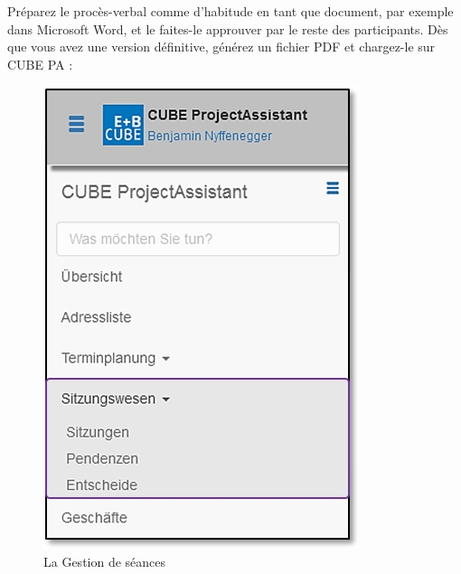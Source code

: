 Préparez le procès-verbal comme d'habitude en tant que document, par exemple dans Microsoft Word, et le faites-le approuver par le reste des participants. Dès que vous avez une version définitive, générez un fichier PDF et chargez-le sur CUBE PA :

\vspace{\baselineskip}

\begin{figure}   %
  \vspace{-35pt}      %
  \begin{center}
    \includegraphics[width=1\linewidth]{../chapters/05_Sitzungswesen/pictures/5-1_Menu_Sitzungswesen.jpg}
  \end{center}
  \vspace{-20pt}
  \caption{La Gestion de séances}
  \vspace{-10pt}
\end{figure}

